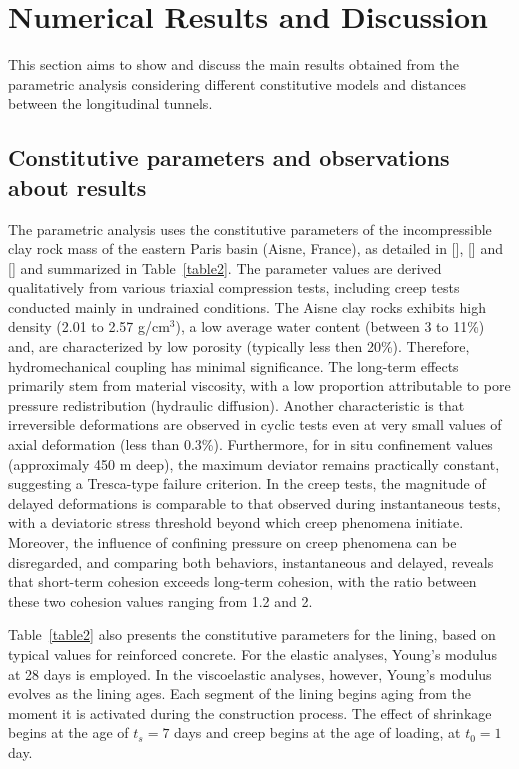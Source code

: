 \documentclass[a4paper,fleqn]{cas-sc}
\begin{document}
\section{Numerical Results and Discussion}\label{}

This section aims to show and discuss the main results obtained from the parametric analysis considering different constitutive models and distances between the longitudinal tunnels.

\subsection{Constitutive parameters and observations about results}\label{}

The parametric analysis uses the constitutive parameters of the incompressible clay rock mass of the eastern Paris basin (Aisne, France), as detailed in [], [] and [] and summarized in Table~\ref{table2}. The parameter values are derived qualitatively from various triaxial compression tests, including creep tests conducted mainly in undrained conditions. The Aisne clay rocks exhibits high density  (2.01 to 2.57 g/cm$^3$), a low average water content (between 3 to 11\%) and, are characterized by low porosity (typically less then 20\%). Therefore, hydromechanical coupling has minimal significance. The long-term effects primarily stem from material viscosity, with a low proportion attributable to pore pressure redistribution (hydraulic diffusion). Another characteristic is that irreversible deformations are observed in cyclic tests even at very small values of axial deformation (less than 0.3\%). Furthermore, for in situ confinement values (approximaly 450 m deep), the maximum deviator remains practically constant, suggesting a Tresca-type failure criterion. In the creep tests, the magnitude of delayed deformations is comparable to that observed during instantaneous tests, with a deviatoric stress threshold beyond which creep phenomena initiate. Moreover, the influence of confining pressure on creep phenomena can be disregarded, and comparing both behaviors, instantaneous and delayed, reveals that short-term cohesion exceeds long-term cohesion, with the ratio between these two cohesion values ranging from 1.2 and 2. 

Table~\ref{table2} also presents the constitutive parameters for the lining, based on typical values for reinforced concrete. For the elastic analyses, Young's modulus at 28 days is employed. In the viscoelastic analyses, however, Young's modulus evolves as the lining ages. Each segment of the lining begins aging from the moment it is activated during the construction process. The effect of shrinkage begins at the age of $t_s = 7$ days and creep begins at the age of loading, at $t_0 = 1$ day.
\end{document}
